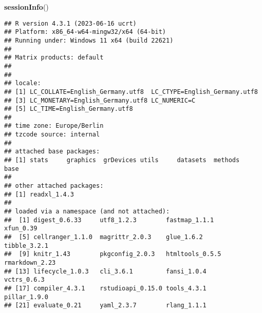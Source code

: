 \documentclass[
]{article}
\newenvironment{Shaded}{\begin{snugshade}}{\end{snugshade}}
\newcommand{\FunctionTok}[1]{\textcolor[rgb]{0.13,0.29,0.53}{\textbf{#1}}}
\newcommand{\NormalTok}[1]{#1}
\begin{document}
\begin{Shaded}
\begin{Highlighting}[]
\FunctionTok{sessionInfo}\NormalTok{()}
\end{Highlighting}
\end{Shaded}

\begin{verbatim}
## R version 4.3.1 (2023-06-16 ucrt)
## Platform: x86_64-w64-mingw32/x64 (64-bit)
## Running under: Windows 11 x64 (build 22621)
## 
## Matrix products: default
## 
## 
## locale:
## [1] LC_COLLATE=English_Germany.utf8  LC_CTYPE=English_Germany.utf8   
## [3] LC_MONETARY=English_Germany.utf8 LC_NUMERIC=C                    
## [5] LC_TIME=English_Germany.utf8    
## 
## time zone: Europe/Berlin
## tzcode source: internal
## 
## attached base packages:
## [1] stats     graphics  grDevices utils     datasets  methods   base     
## 
## other attached packages:
## [1] readxl_1.4.3
## 
## loaded via a namespace (and not attached):
##  [1] digest_0.6.33     utf8_1.2.3        fastmap_1.1.1     xfun_0.39        
##  [5] cellranger_1.1.0  magrittr_2.0.3    glue_1.6.2        tibble_3.2.1     
##  [9] knitr_1.43        pkgconfig_2.0.3   htmltools_0.5.5   rmarkdown_2.23   
## [13] lifecycle_1.0.3   cli_3.6.1         fansi_1.0.4       vctrs_0.6.3      
## [17] compiler_4.3.1    rstudioapi_0.15.0 tools_4.3.1       pillar_1.9.0     
## [21] evaluate_0.21     yaml_2.3.7        rlang_1.1.1
\end{verbatim}
\end{document}
